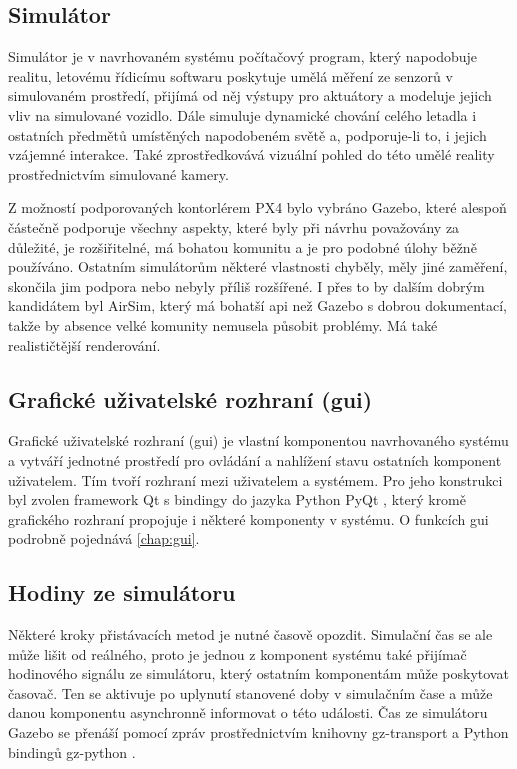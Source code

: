     \subsection{Simulátor}
      Simulátor je v navrhovaném systému počítačový program, který napodobuje realitu, letovému řídicímu softwaru poskytuje umělá měření ze senzorů v simulovaném prostředí, přijímá od něj výstupy pro aktuátory a modeluje jejich vliv na simulované vozidlo. Dále simuluje dynamické chování celého letadla i ostatních předmětů umístěných napodobeném světě a, podporuje-li to, i jejich vzájemné interakce. Také zprostředkovává vizuální pohled do této umělé reality prostřednictvím simulované kamery.

      Z možností podporovaných kontorlérem PX4 bylo vybráno Gazebo, které alespoň částečně podporuje všechny aspekty, které byly při návrhu považovány za důležité, je rozšiřitelné, má bohatou komunitu a je pro podobné úlohy běžně používáno. Ostatním simulátorům některé vlastnosti chyběly, měly jiné zaměření, skončila jim podpora nebo nebyly příliš rozšířené. I přes to by dalším dobrým kandidátem byl AirSim, který má bohatší \acrshort{api} než Gazebo s dobrou dokumentací, takže by absence velké komunity nemusela působit problémy. Má také realističtější renderování.
    \subsection{Grafické uživatelské rozhraní (\acrshort{gui})}
      Grafické uživatelské rozhraní (\acrshort{gui}) je vlastní komponentou navrhovaného systému a vytváří jednotné prostředí pro ovládání a nahlížení stavu ostatních komponent uživatelem. Tím tvoří rozhraní mezi uživatelem a systémem. Pro jeho konstrukci byl zvolen framework Qt s bindingy do jazyka Python PyQt \cite{pyqt}, který kromě grafického rozhraní propojuje i některé komponenty v systému. O funkcích \acrshort{gui} podrobně pojednává \cref{chap:gui}. 
    \subsection{Hodiny ze simulátoru}
      Některé kroky přistávacích metod je nutné časově opozdit. Simulační čas se ale může lišit od reálného, proto je jednou z komponent systému také přijímač hodinového signálu ze simulátoru, který ostatním komponentám může poskytovat časovač. Ten se aktivuje po uplynutí stanovené doby v simulačním čase a může danou komponentu asynchronně informovat o této události. Čas ze simulátoru Gazebo se přenáší pomocí zpráv prostřednictvím knihovny gz-transport a Python bindingů gz-python \cite{gz-python}. 
